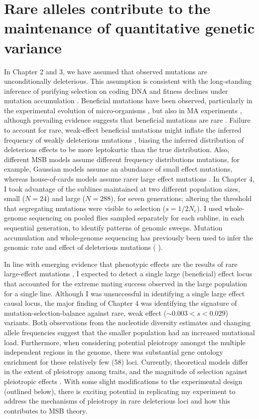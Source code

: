 \section{Rare alleles contribute to the maintenance of quantitative genetic variance}
In Chapter 2 and 3, we have assumed that observed mutations are unconditionally deleterious. This assumption is consistent with the long-standing inference of purifying selection on coding DNA \citep{Kimu83, Ohta92,Li97} and fitness declines under mutation accumulation \citep{Hall09}. Beneficial mutations have been observed, particularly in the experimental evolution of micro-organisms
\citep[e.g.,][]{Jose04}, but also in MA experiments \citep[e.g.,][]{Shaw00}, although prevailing evidence suggests that beneficial mutations are rare \citep{Bata14, Heil14, Rock15}. Failure to account for rare, weak-effect beneficial mutations might inflate the inferred frequency of weakly deleterious mutations \citep{Tata17}, biasing the inferred distribution of deleterious effects to be more leptokurtic than the true distribution. Also, different MSB models assume different frequency distributions mutations, for example, Gaussian models assume an abundance of small effect mutations, whereas house-of-cards models assume rarer large effect mutations \citep{Land75, Ture84, Ture85, Wals18}. In Chapter 4, I took advantage of the sublines maintained at two different population sizes, small ($N =24$) and large ($N = 288$), for seven generations; altering the threshold that segregating mutations were visible to selection ($s = 1/2N_e$). I used whole-genome sequencing on pooled flies sampled separately for each subline, in each sequential generation, to identify patterns of genomic sweeps. Mutation accumulation and whole-genome sequencing has previously been used to infer the genomic rate and effect of deleterious mutations (\citealp[e.g.,][]{Keig09a, Huan16} \citealp[reviewed by][]{Katj19}). 

In line with emerging evidence that phenotypic effects are the results of rare large-effect mutations \citep{Mack92A, Davi99, Heil14, McGu14}, I expected to detect a single large (beneficial) effect locus that accounted for the extreme mating success observed in the large population for a single line. Although I was unsuccessful in identifying a single large effect causal locus, the major finding of Chapter 4 was identifying the signature of mutation-selection-balance against rare, weak effect ($\sim 0.003 < s < 0.029$) variants. Both observations from the nucleotide diversity estimates and changing allele frequencies suggest that the smaller population had an increased mutational load. Furthermore, when considering potential pleiotropy amongst the multiple independent regions in the genome, there was substantial gene ontology enrichment for these relatively few (58) loci. Currently, theoretical models differ in the extent of pleiotropy among traits, and the magnitude of selection against pleiotropic effects \citep{Ture85, Bart90,John05}. With some slight modifications to the experimental design (outlined below), there is exciting potential in replicating my experiment to address the mechanisms of pleiotropy in rare deleterious loci and how this contributes to MSB theory. \par


